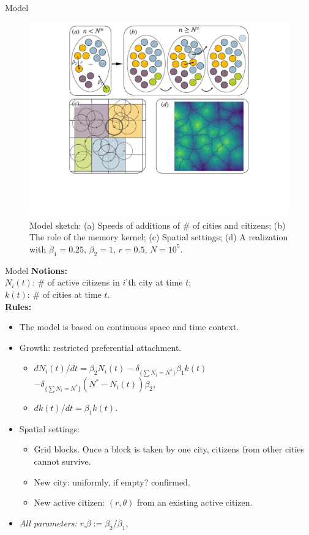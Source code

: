 \begin{frame}{Model}
    \begin{figure}
        \centering
        \includegraphics[width = 0.8\linewidth]{Pics/sketchgood.pdf}
        \caption{Model sketch: (a) Speeds of additions of \# of cities and citizens; (b) The role of the memory kernel; (c) Spatial settings; (d) A realization with $\beta_1 = 0.25$, $\beta_2 = 1$, $r=0.5$, $N = 10^5$. }
        \label{fig:sketch}
    \end{figure}
\end{frame}
\begin{frame}{Model}
    \textbf{Notions:}\\
    \hspace{0.25cm}$N_i(t)$: \# of active citizens in $i$'th city at time $t$;\\ \hspace{0.25cm}$k(t)$: \# of cities at time $t$.\\
    \textbf{Rules:}
    \begin{itemize}
        \item The model is based on continuous space and time context.
    \item Growth: restricted preferential attachment. 
    \begin{itemize}
        \item $dN_i(t)/dt = \beta_2 N_i(t) -\delta_{\{\sum N_i = N^*\}} \beta_1k(t)$\\ \hspace{1.8cm}$-\delta_{\{\sum N_i = N^*\}} (N^*-N_i(t))\beta_2$,
        \item $dk(t)/dt = \beta_1k(t)$.
    \end{itemize}
    
    \item Spatial settings:
    \begin{itemize}
        \item Grid blocks. Once a block is taken by one city, citizens from other cities cannot survive.
        \item New city: uniformly, if empty? confirmed.
        \item New active citizen: $(r,\theta)$ from an existing active citizen.
    \end{itemize}
    \item \textit{All parameters:} $r$,$\beta:=\beta_2/\beta_1,$
    \end{itemize}
\end{frame}

